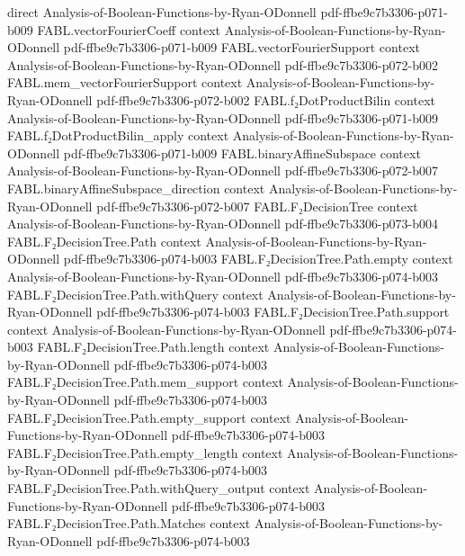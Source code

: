 \begin{theorem}
  {direct}
  {Analysis-of-Boolean-Functions-by-Ryan-ODonnell}
  {pdf-ffbe9c7b3306-p071-b009}
\proofstep
  {FABL.vectorFourierCoeff}
  {context}
  {Analysis-of-Boolean-Functions-by-Ryan-ODonnell}
  {pdf-ffbe9c7b3306-p071-b009}
\proofstep
  {FABL.vectorFourierSupport}
  {context}
  {Analysis-of-Boolean-Functions-by-Ryan-ODonnell}
  {pdf-ffbe9c7b3306-p072-b002}
\proofstep
  {FABL.mem_vectorFourierSupport}
  {context}
  {Analysis-of-Boolean-Functions-by-Ryan-ODonnell}
  {pdf-ffbe9c7b3306-p072-b002}
\proofstep
  {FABL.f₂DotProductBilin}
  {context}
  {Analysis-of-Boolean-Functions-by-Ryan-ODonnell}
  {pdf-ffbe9c7b3306-p071-b009}
\proofstep
  {FABL.f₂DotProductBilin_apply}
  {context}
  {Analysis-of-Boolean-Functions-by-Ryan-ODonnell}
  {pdf-ffbe9c7b3306-p071-b009}
\proofstep
  {FABL.binaryAffineSubspace}
  {context}
  {Analysis-of-Boolean-Functions-by-Ryan-ODonnell}
  {pdf-ffbe9c7b3306-p072-b007}
\proofstep
  {FABL.binaryAffineSubspace_direction}
  {context}
  {Analysis-of-Boolean-Functions-by-Ryan-ODonnell}
  {pdf-ffbe9c7b3306-p072-b007}
\proofstep
  {FABL.F₂DecisionTree}
  {context}
  {Analysis-of-Boolean-Functions-by-Ryan-ODonnell}
  {pdf-ffbe9c7b3306-p073-b004}
\proofstep
  {FABL.F₂DecisionTree.Path}
  {context}
  {Analysis-of-Boolean-Functions-by-Ryan-ODonnell}
  {pdf-ffbe9c7b3306-p074-b003}
\proofstep
  {FABL.F₂DecisionTree.Path.empty}
  {context}
  {Analysis-of-Boolean-Functions-by-Ryan-ODonnell}
  {pdf-ffbe9c7b3306-p074-b003}
\proofstep
  {FABL.F₂DecisionTree.Path.withQuery}
  {context}
  {Analysis-of-Boolean-Functions-by-Ryan-ODonnell}
  {pdf-ffbe9c7b3306-p074-b003}
\proofstep
  {FABL.F₂DecisionTree.Path.support}
  {context}
  {Analysis-of-Boolean-Functions-by-Ryan-ODonnell}
  {pdf-ffbe9c7b3306-p074-b003}
\proofstep
  {FABL.F₂DecisionTree.Path.length}
  {context}
  {Analysis-of-Boolean-Functions-by-Ryan-ODonnell}
  {pdf-ffbe9c7b3306-p074-b003}
\proofstep
  {FABL.F₂DecisionTree.Path.mem_support}
  {context}
  {Analysis-of-Boolean-Functions-by-Ryan-ODonnell}
  {pdf-ffbe9c7b3306-p074-b003}
\proofstep
  {FABL.F₂DecisionTree.Path.empty_support}
  {context}
  {Analysis-of-Boolean-Functions-by-Ryan-ODonnell}
  {pdf-ffbe9c7b3306-p074-b003}
\proofstep
  {FABL.F₂DecisionTree.Path.empty_length}
  {context}
  {Analysis-of-Boolean-Functions-by-Ryan-ODonnell}
  {pdf-ffbe9c7b3306-p074-b003}
\proofstep
  {FABL.F₂DecisionTree.Path.withQuery_output}
  {context}
  {Analysis-of-Boolean-Functions-by-Ryan-ODonnell}
  {pdf-ffbe9c7b3306-p074-b003}
\proofstep
  {FABL.F₂DecisionTree.Path.Matches}
  {context}
  {Analysis-of-Boolean-Functions-by-Ryan-ODonnell}
  {pdf-ffbe9c7b3306-p074-b003}

\end{theorem}
